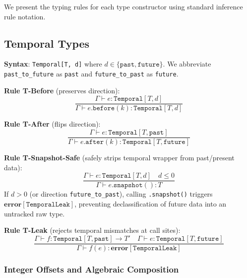 \documentclass[11pt,a4paper]{article}
\newcommand{\ty}[1]{\texttt{#1}}
\begin{document}
We present the typing rules for each type constructor using standard inference rule notation.

\subsection{Temporal Types}
\label{sec:temporal}

\textbf{Syntax}: \ty{Temporal[T, d]} where $d \in \{\ty{past}, \ty{future}\}$. We abbreviate \ty{past\_to\_future} as \ty{past} and \ty{future\_to\_past} as \ty{future}.

\textbf{Rule T-Before} (preserves direction):
\begin{equation}
\frac{\Gamma \vdash e : \ty{Temporal}[T, d]}{\Gamma \vdash e.\ty{before}(k) : \ty{Temporal}[T, d]}
\end{equation}

\textbf{Rule T-After} (flips direction):
\begin{equation}
\frac{\Gamma \vdash e : \ty{Temporal}[T, \ty{past}]}{\Gamma \vdash e.\ty{after}(k) : \ty{Temporal}[T, \ty{future}]}
\end{equation}

\textbf{Rule T-Snapshot-Safe} (safely strips temporal wrapper from past/present data):
\begin{equation}
\frac{\Gamma \vdash e : \ty{Temporal}[T, d] \quad d \leq 0}{\Gamma \vdash e.\ty{snapshot}() : T}
\end{equation}
If $d > 0$ (or direction \ty{future\_to\_past}), calling \ty{.snapshot()} triggers $\textbf{error}[\ty{TemporalLeak}]$, preventing declassification of future data into an untracked raw type.

\textbf{Rule T-Leak} (rejects temporal mismatches at call sites):
\begin{equation}
\frac{\Gamma \vdash f : \ty{Temporal}[T, \ty{past}] \to T' \quad \Gamma \vdash e : \ty{Temporal}[T, \ty{future}]}{\Gamma \vdash f(e) : \textbf{error}[\ty{TemporalLeak}]}
\end{equation}

\subsubsection{Integer Offsets and Algebraic Composition}
\end{document}
